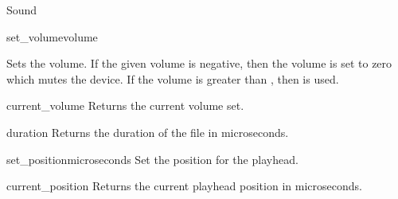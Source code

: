 \begin{classdesc*}{Sound}
\begin{methoddesc}[Sound]{set_volume}{volume}

Sets the volume. If the given volume is negative, then the volume is set to 
zero which mutes the device. If the volume is greater than , 
then  is used.
\end{methoddesc}

\begin{methoddesc}[Sound]{current_volume}{}
Returns the current volume set.
\end{methoddesc}

\begin{methoddesc}[Sound]{duration}{}
Returns the duration of the file in microseconds.
\end{methoddesc}

\begin{methoddesc}[Sound]{set_position}{microseconds}
Set the position for the playhead.
\end{methoddesc}

\begin{methoddesc}[Sound]{current_position}{}
Returns the current playhead position in microseconds.
\end{methoddesc}

\end{classdesc*}
